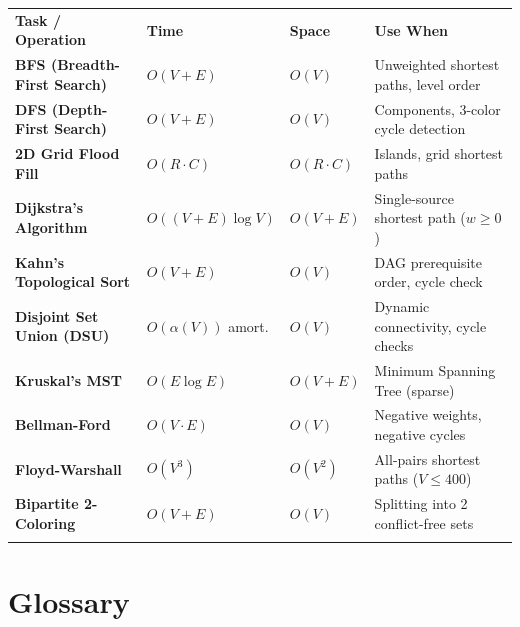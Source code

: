 \documentclass[11pt,a4paper]{article}
\theoremstyle{definition}
\begin{document}
\begingroup\small{}
\begin{tabularx}{\textwidth}{>{\raggedright\arraybackslash\bfseries}p{4.1cm} >{\centering\arraybackslash}p{2.3cm} >{\centering\arraybackslash}p{1.8cm} >{\raggedright\arraybackslash}X}
\arrayrulecolor{primaryblue}\toprule[1.2pt]
\rowcolor{primaryblue!10}
\textcolor{primaryblue}{\textbf{Task / Operation}} & \textcolor{primaryblue}{\textbf{Time}} & \textcolor{primaryblue}{\textbf{Space}} & \textcolor{primaryblue}{\textbf{Use When}} \\
\arrayrulecolor{codeframe}\midrule[0.6pt]
BFS (Breadth-First Search) & $O(V + E)$ & $O(V)$ & Unweighted shortest paths, level order \\
DFS (Depth-First Search) & $O(V + E)$ & $O(V)$ & Components, 3-color cycle detection \\
2D Grid Flood Fill & $O(R \cdot C)$ & $O(R \cdot C)$ & Islands, grid shortest paths \\
Dijkstra's Algorithm & $O((V + E) \log V)$ & $O(V + E)$ & Single-source shortest path ($w \ge 0$) \\
Kahn's Topological Sort & $O(V + E)$ & $O(V)$ & DAG prerequisite order, cycle check \\
Disjoint Set Union (DSU) & $O(\alpha(V))$ amort. & $O(V)$ & Dynamic connectivity, cycle checks \\
Kruskal's MST & $O(E \log E)$ & $O(V + E)$ & Minimum Spanning Tree (sparse) \\
Bellman-Ford & $O(V \cdot E)$ & $O(V)$ & Negative weights, negative cycles \\
Floyd-Warshall & $O(V^3)$ & $O(V^2)$ & All-pairs shortest paths ($V \le 400$) \\
Bipartite 2-Coloring & $O(V + E)$ & $O(V)$ & Splitting into 2 conflict-free sets \\
\arrayrulecolor{primaryblue}\bottomrule[1.2pt]
\end{tabularx}\endgroup

\section{Glossary}
\end{document}
